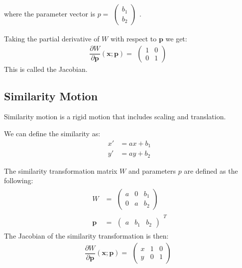 \documentclass{article}
\begin{document}
where the parameter vector is $p = \begin{matrix}\begin{pmatrix} b_1 \\ b_2 \end{pmatrix}\end{matrix}$.

Taking the partial derivative of $W$ with respect to $\bm{p}$ we get:
\begin{equation}
  \frac{\partial W}{\partial \bm{p}}(\bm{x}; \bm{p}) = \begin{matrix}
  											\begin{pmatrix} 1 & 0 \\ 0 & 1 \end{pmatrix}
                                       \end{matrix}
\end{equation}
This is called the Jacobian.

\subsection{Similarity Motion}
Similarity motion is a rigid motion that includes scaling and translation.

We can define the similarity as:
\begin{equation}
	\begin{aligned}
      x' &= ax + b_1 \\
      y' &= ay + b_2
    \end{aligned}
\end{equation}

The similarity transformation matrix $W$ and parameters $p$ are defined as the following:
\begin{equation}
	\begin{aligned}
		W &= \begin{matrix}
			\begin{pmatrix}
				a & 0 & b_1 \\
                0 & a & b_2
			\end{pmatrix}
		\end{matrix} \\
        \bm{p} &= \begin{matrix}
        	\begin{pmatrix}
        		a & b_1 & b_2
        	\end{pmatrix}
        \end{matrix} ^ T
	\end{aligned}
\end{equation}
The Jacobian of the similarity transformation is then:
\begin{equation}
	\frac{\partial W}{\partial \bm{p}}(\bm{x}; \bm{p}) = \begin{matrix}
      \begin{pmatrix}
          x & 1 & 0 \\
          y & 0 & 1
      \end{pmatrix}
	\end{matrix}
\end{equation}
\end{document}
